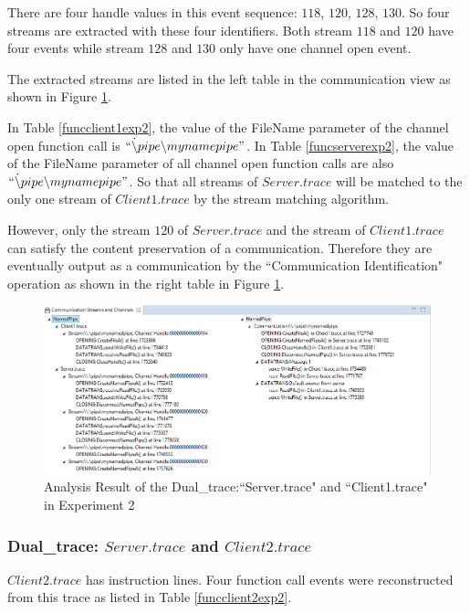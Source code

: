 There are four handle values in this event sequence: $118$, $120$, $128$, $130$. So four streams are extracted with these four identifiers. Both stream $118$ and $120$ have four events while stream $128$ and $130$ only have one channel open event. 

The extracted streams are listed in the left table in the communication view as shown in Figure \ref{result21}.

In Table \ref{funcclient1exp2}, the value of the FileName parameter of the channel open function call is $``\dot \backslash pipe \backslash mynamepipe"$. In Table \ref{funcserverexp2}, the value of the FileName parameter of all channel open function calls are also $``\dot \backslash pipe \backslash mynamepipe"$. So that all streams of $Server.trace$ will be matched to the only one stream of $Client1.trace$ by the stream matching algorithm.

However, only the stream $120$ of $Server.trace$ and the stream of $Client1.trace$ can satisfy the content preservation of a communication. Therefore they are eventually output as a communication by the ``Communication Identification" operation as shown in the right table in Figure \ref{result21}. 


\begin{figure}[H]
\centerline{\includegraphics[scale=0.55]{Figures/result21}}
 \caption{Analysis Result of the Dual\_trace:``Server.trace" and ``Client1.trace" in Experiment 2}
\label{result21}
\end{figure}

\subsubsection{Dual\_trace: $Server.trace$ and $Client2.trace$}
$Client2.trace$ has instruction lines. Four function call events were reconstructed from this trace as listed in Table \ref{funcclient2exp2}.


